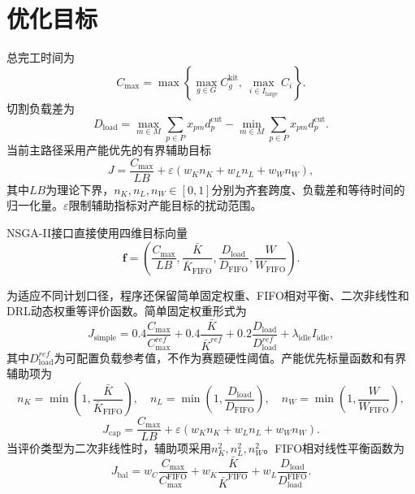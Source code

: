 \documentclass[UTF8,zihao=-4,openany]{ctexrep}
\begin{document}
\section{优化目标}

总完工时间为
\begin{equation}
 C_{\max}=\max\left\{\max_{g\in G}C_g^{\mathrm{kit}},\ \max_{i\in I_{\mathrm{large}}}C_i\right\}.
\end{equation}
切割负载差为
\begin{equation}
 D_{\mathrm{load}}=\max_{m\in M}\sum_{p\in P}x_{pm}d_p^{\mathrm{cut}}
 -\min_{m\in M}\sum_{p\in P}x_{pm}d_p^{\mathrm{cut}}.
\end{equation}
当前主路径采用产能优先的有界辅助目标
\begin{equation}
 J=\frac{C_{\max}}{LB}+\varepsilon
 \left(w_K n_K+w_L n_L+w_W n_W\right),
\end{equation}
其中$LB$为理论下界，$n_K,n_L,n_W\in[0,1]$分别为齐套跨度、负载差和等待时间的归一化量。$\varepsilon$限制辅助指标对产能目标的扰动范围。

NSGA-II接口直接使用四维目标向量
\begin{equation}
 \bm f=\left(\frac{C_{\max}}{LB},\frac{\bar K}{\bar K_{\mathrm{FIFO}}},
 \frac{D_{\mathrm{load}}}{D_{\mathrm{FIFO}}},\frac{W}{W_{\mathrm{FIFO}}}\right).
\end{equation}

为适应不同计划口径，程序还保留简单固定权重、FIFO相对平衡、二次非线性和DRL动态权重等评价函数。简单固定权重形式为
\begin{equation}
 J_{\mathrm{simple}}
 =0.4\frac{C_{\max}}{C_{\max}^{ref}}
 +0.4\frac{\bar K}{\bar K^{ref}}
 +0.2\frac{D_{\mathrm{load}}}{D_{\mathrm{load}}^{ref}}
 +\lambda_{\mathrm{idle}}I_{\mathrm{idle}},
\end{equation}
其中$D_{\mathrm{load}}^{ref}$为可配置负载参考值，不作为赛题硬性阈值。产能优先标量函数和有界辅助项为
\begin{equation}
 n_K=\min\left(1,\frac{\bar K}{\bar K_{\mathrm{FIFO}}}\right),\quad
 n_L=\min\left(1,\frac{D_{\mathrm{load}}}{D_{\mathrm{FIFO}}}\right),\quad
 n_W=\min\left(1,\frac{W}{W_{\mathrm{FIFO}}}\right),
\end{equation}
\begin{equation}
 J_{\mathrm{cap}}=\frac{C_{\max}}{LB}
 +\varepsilon\left(w_Kn_K+w_Ln_L+w_Wn_W\right).
\end{equation}
当评价类型为二次非线性时，辅助项采用$n_K^2,n_L^2,n_W^2$。FIFO相对线性平衡函数为
\begin{equation}
 J_{\mathrm{bal}}
 =w_C\frac{C_{\max}}{C_{\max}^{\mathrm{FIFO}}}
 +w_K\frac{\bar K}{\bar K^{\mathrm{FIFO}}}
 +w_L\frac{D_{\mathrm{load}}}{D_{\mathrm{load}}^{\mathrm{FIFO}}}.
\end{equation}
\end{document}
